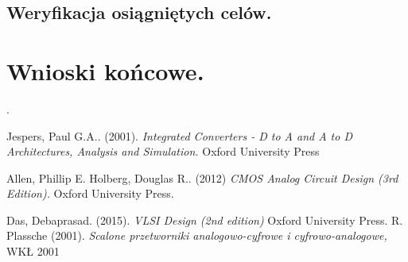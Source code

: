 \documentclass[10pt,a4paper]{report}
\begin{document}
	\section{Weryfikacja osiągniętych celów.}
	
	\chapter{Wnioski końcowe.}
	
	\appendix
.
	\begin{thebibliography}{9}
		Jespers, Paul G.A.. (2001). 
		\textit{Integrated Converters - D to A and A to D Architectures, Analysis and Simulation.}
		Oxford University Press
		
		Allen, Phillip E. Holberg, Douglas R.. (2012)  
		\textit{CMOS Analog Circuit Design (3rd Edition). }
		Oxford University Press.
		
		Das, Debaprasad. (2015).
		\textit{VLSI Design (2nd edition)}
		Oxford University Press.
		R. Plassche (2001). 
		\textit{Scalone przetworniki analogowo-cyfrowe i cyfrowo-analogowe,}
		WKŁ 2001
		
		
	\end{thebibliography}
\end{document}
